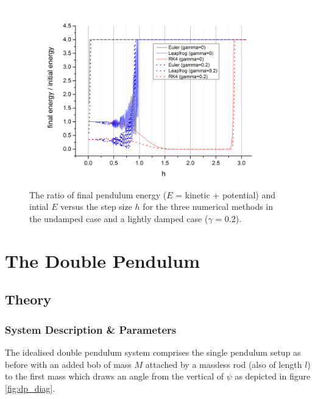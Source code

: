 \documentclass[11pt]{article}
\begin{document}
\setlength{\columnsep}{30pt} %
\begin{figure}
\includegraphics[width=1.1\textwidth]{img/energy_ratio_vs_h.png}
\caption{The ratio of final pendulum energy ($E$ = kinetic + potential) and intial $E$ versus the step size $h$ for the three numerical methods in the undamped case and a lightly damped case ($\gamma$ = 0.2).}
\label{fig:e_vs_h}
\end{figure}

\section{The Double Pendulum}
\subsection{Theory}
\subsubsection*{System Description \& Parameters}
The idealised double pendulum system comprises the single pendulum setup as before with an added bob of mass $M$ attached by a massless rod (also of length $l$) to the first mass which draws an angle from the vertical of $\psi$ as depicted in figure \ref{fig:dp_diag}.
\end{document}
